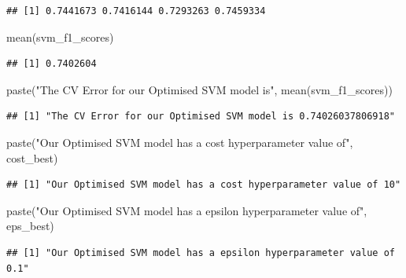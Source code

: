 \documentclass[
]{article}
\newenvironment{Shaded}{\begin{snugshade}}{\end{snugshade}}
\newcommand{\FunctionTok}[1]{\textcolor[rgb]{0.00,0.00,0.00}{#1}}
\newcommand{\NormalTok}[1]{#1}
\newcommand{\StringTok}[1]{\textcolor[rgb]{0.31,0.60,0.02}{#1}}
\begin{document}
\begin{verbatim}
## [1] 0.7441673 0.7416144 0.7293263 0.7459334
\end{verbatim}

\begin{Shaded}
\begin{Highlighting}[]
\FunctionTok{mean}\NormalTok{(svm\_f1\_scores)}
\end{Highlighting}
\end{Shaded}

\begin{verbatim}
## [1] 0.7402604
\end{verbatim}

\begin{Shaded}
\begin{Highlighting}[]
\FunctionTok{paste}\NormalTok{(}\StringTok{"The CV Error for our Optimised SVM model is"}\NormalTok{, }\FunctionTok{mean}\NormalTok{(svm\_f1\_scores))}
\end{Highlighting}
\end{Shaded}

\begin{verbatim}
## [1] "The CV Error for our Optimised SVM model is 0.74026037806918"
\end{verbatim}

\begin{Shaded}
\begin{Highlighting}[]
\FunctionTok{paste}\NormalTok{(}\StringTok{"Our Optimised SVM model has a cost hyperparameter value of"}\NormalTok{, cost\_best)}
\end{Highlighting}
\end{Shaded}

\begin{verbatim}
## [1] "Our Optimised SVM model has a cost hyperparameter value of 10"
\end{verbatim}

\begin{Shaded}
\begin{Highlighting}[]
\FunctionTok{paste}\NormalTok{(}\StringTok{"Our Optimised SVM model has a epsilon hyperparameter value of"}\NormalTok{, eps\_best)}
\end{Highlighting}
\end{Shaded}

\begin{verbatim}
## [1] "Our Optimised SVM model has a epsilon hyperparameter value of 0.1"
\end{verbatim}
\end{document}
